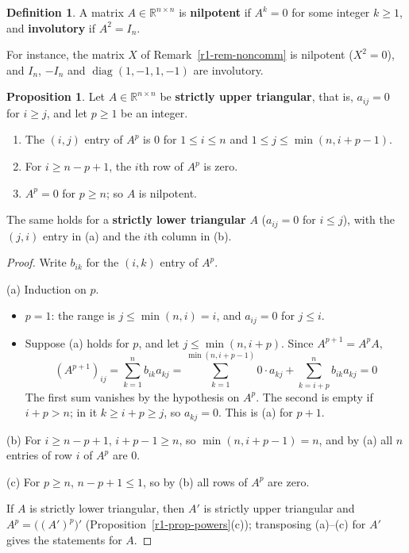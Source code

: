 \documentclass[12pt]{article}
\newcommand{\R}{\mathbb R}
\DeclareMathOperator{\diag}{diag}
\theoremstyle{definition}
\newtheorem{proposition}[theorem]{Proposition}
\newtheorem{definition}[theorem]{Definition}
\begin{document}
\begin{definition}\label{r1-def-nilpotent}
A matrix \(A\in\R^{n\times n}\) is \textbf{nilpotent} if \(A^k=0\) for some integer \(k\geqslant1\), and
\textbf{involutory} if \(A^2=I_n\).
\end{definition}
For instance, the matrix \(X\) of Remark~\ref{r1-rem-noncomm} is nilpotent (\(X^2=0\)), and \(I_n\), \(-I_n\) and
\(\diag(1,-1,1,-1)\) are involutory.

\begin{proposition}\label{r1-prop-strictly-triangular}
Let \(A\in\R^{n\times n}\) be \textbf{strictly upper triangular}, that is, \(a_{ij}=0\) for \(i\geqslant j\), and let
\(p\geqslant1\) be an integer.
\begin{enumerate}
\item The \((i,j)\) entry of \(A^p\) is \(0\) for \(1\leqslant i\leqslant n\) and \(1\leqslant j\leqslant\min(n,i+p-1)\).
\item For \(i\geqslant n-p+1\), the \(i\)th row of \(A^p\) is zero.
\item \(A^p=0\) for \(p\geqslant n\); so \(A\) is nilpotent.
\end{enumerate}
The same holds for a \textbf{strictly lower triangular} \(A\) (\(a_{ij}=0\) for \(i\leqslant j\)), with the
\((j,i)\) entry in (a) and the \(i\)th column in (b).
\end{proposition}
\begin{proof}
Write \(b_{ik}\) for the \((i,k)\) entry of \(A^p\).

(a) Induction on \(p\).
\begin{itemize}
\item \(p=1\): the range is \(j\leqslant\min(n,i)=i\), and \(a_{ij}=0\) for \(j\leqslant i\).
\item Suppose (a) holds for \(p\), and let \(j\leqslant\min(n,i+p)\). Since \(A^{p+1}=A^pA\),
\[
(A^{p+1})_{ij}=\sum_{k=1}^nb_{ik}a_{kj}=\sum_{k=1}^{\min(n,i+p-1)}0\cdot a_{kj}+\sum_{k=i+p}^nb_{ik}a_{kj}=0
\]
The first sum vanishes by the hypothesis on \(A^p\). The second is empty if \(i+p>n\); in it
\(k\geqslant i+p\geqslant j\), so \(a_{kj}=0\). This is (a) for \(p+1\).
\end{itemize}
(b) For \(i\geqslant n-p+1\), \(i+p-1\geqslant n\), so \(\min(n,i+p-1)=n\), and by (a) all \(n\) entries of row \(i\)
of \(A^p\) are \(0\).

(c) For \(p\geqslant n\), \(n-p+1\leqslant1\), so by (b) all rows of \(A^p\) are zero.

If \(A\) is strictly lower triangular, then \(A'\) is strictly upper triangular and \(A^p=\bigl((A')^p\bigr)'\)
(Proposition~\ref{r1-prop-powers}(c)); transposing (a)--(c) for \(A'\) gives the statements for \(A\).
\end{proof}
\end{document}
